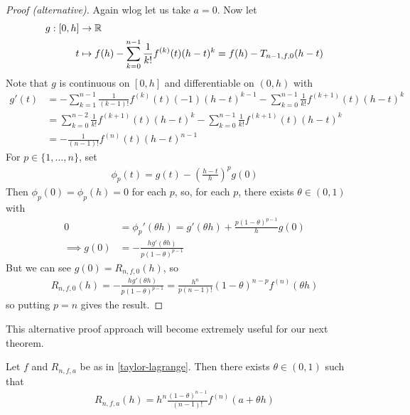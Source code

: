 \documentclass{../../template/note}
\begin{document}
    \begin{proof}[Proof (alternative)]
        Again wlog let us take \(a=0\). Now let
        \begin{align*}
            g: [0, h] &\to \mathbb R \\
            t &\mapsto f(h) - \sum_{k=0}^{n-1} \frac 1 {k!} f^{(k)}(t) (h-t)^k = f(h) - T_{n-1,f,0}(h-t)
        \end{align*}
        Note that \(g\) is continuous on \([0, h]\) and differentiable on \((0, h)\) with
        \begin{align*}
            g'(t) &= -\sum_{k=1}^{n-1} \frac 1 {(k-1)!} f^{(k)}(t) (-1) (h-t)^{k-1} - \sum_{k=0}^{n-1} \frac 1 {k!} f^{(k+1)}(t) (h-t)^k \\
            &= \sum_{k=0}^{n-2} \frac 1 {k!} f^{(k+1)}(t)(h-t)^{k} - \sum_{k=0}^{n-1} \frac 1 {k!} f^{(k+1)}(t) (h-t)^k \\
            &= -\frac 1 {(n-1)!} f^{(n)}(t) (h-t)^{n-1}
        \end{align*}
        For \(p \in \{1, \dots, n\}\), set
        \begin{align*}
            \phi_p(t) = g(t) - \left(\frac{h-t}{h}\right)^pg(0)
        \end{align*}
        Then \(\phi_p(0) = \phi_p(h) = 0\) for each \(p\), so, for each \(p\), there exists \(\theta \in (0, 1)\) with
        \begin{align*}
            0 &= \phi_p'(\theta h) = g'(\theta h) + \frac{p(1-\theta)^{p-1}}{h}g(0) \\
            \implies g(0) &= -\frac{hg'(\theta h)}{p(1-\theta)^{p-1}}
        \end{align*}
        But we can see \(g(0) = R_{n, f, 0}(h)\), so
        \begin{align*}
            R_{n, f, 0}(h) = -\frac{hg'(\theta h)}{p(1-\theta)^{p-1}} = \frac{h^n}{p(n-1)!}(1-\theta)^{n-p}f^{(n)}(\theta h)
        \end{align*}
        so putting \(p = n\) gives the result.
    \end{proof}
    
    This alternative proof approach will become extremely useful for our next theorem.

    \begin{theorem}
        \label{taylor-cauchy}
        Let \(f\) and \(R_{n,f,a}\) be as in \cref{taylor-lagrange}. Then there exists \(\theta \in (0, 1)\) such that
        \begin{align*}
            R_{n, f, a}(h) = h^n \frac{(1-\theta)^{n-1}}{(n-1)!} f^{(n)}(a + \theta h)
        \end{align*}
    \end{theorem}
\end{document}
